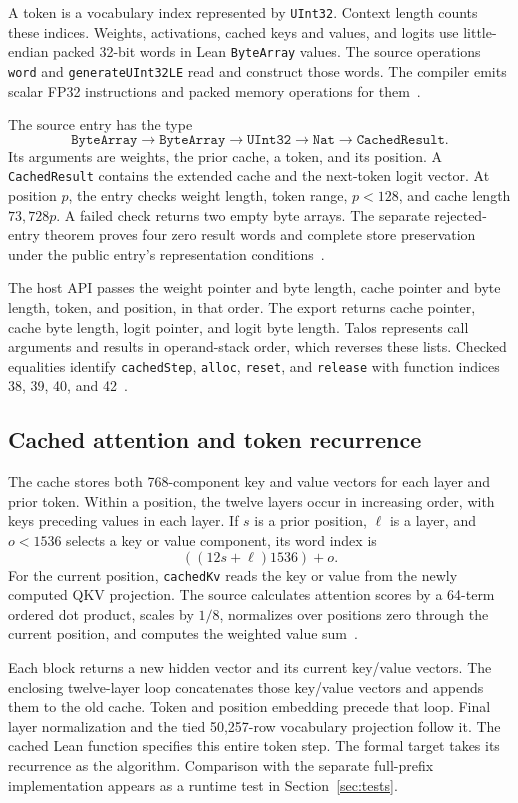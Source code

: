 \documentclass[11pt]{article}
\newcommand{\code}[1]{\texttt{#1}}
\begin{document}
A token is a vocabulary index represented by \code{UInt32}.  Context length counts these indices.  Weights, activations, cached keys and values, and logits use little-endian packed 32-bit words in Lean \code{ByteArray} values.  The source operations \code{word} and \code{generateUInt32LE} read and construct those words.  The compiler emits scalar FP32 instructions and packed memory operations for them~\cite{kernels,packed}.

The source entry has the type
\[
\code{ByteArray}\to\code{ByteArray}\to\code{UInt32}\to\code{Nat}\to\code{CachedResult}.
\]
Its arguments are weights, the prior cache, a token, and its position.  A \code{CachedResult} contains the extended cache and the next-token logit vector.  At position $p$, the entry checks weight length, token range, $p<128$, and cache length $73{,}728p$.  A failed check returns two empty byte arrays.  The separate rejected-entry theorem proves four zero result words and complete store preservation under the public entry's representation conditions~\cite{entry}.

The host API passes the weight pointer and byte length, cache pointer and byte length, token, and position, in that order.  The export returns cache pointer, cache byte length, logit pointer, and logit byte length.  Talos represents call arguments and results in operand-stack order, which reverses these lists.  Checked equalities identify \code{cachedStep}, \code{alloc}, \code{reset}, and \code{release} with function indices 38, 39, 40, and 42~\cite{initialize}.

\subsection{Cached attention and token recurrence}

The cache stores both 768-component key and value vectors for each layer and prior token.  Within a position, the twelve layers occur in increasing order, with keys preceding values in each layer.  If $s$ is a prior position, $\ell$ is a layer, and $o<1536$ selects a key or value component, its word index is
\[
((12s+\ell)1536)+o.
\]
For the current position, \code{cachedKv} reads the key or value from the newly computed QKV projection.  The source calculates attention scores by a 64-term ordered dot product, scales by $1/8$, normalizes over positions zero through the current position, and computes the weighted value sum~\cite{cached}.

Each block returns a new hidden vector and its current key/value vectors.  The enclosing twelve-layer loop concatenates those key/value vectors and appends them to the old cache.  Token and position embedding precede that loop.  Final layer normalization and the tied 50,257-row vocabulary projection follow it.  The cached Lean function specifies this entire token step.  The formal target takes its recurrence as the algorithm.  Comparison with the separate full-prefix implementation appears as a runtime test in Section~\ref{sec:tests}.
\end{document}
